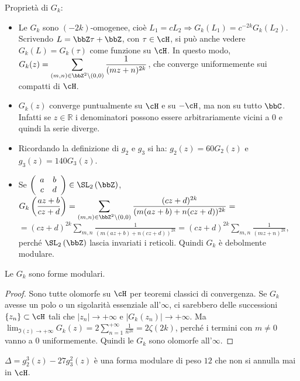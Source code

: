 \begin{osservazione}
Proprietà di $G_k$:

\begin{itemize}
\item Le $G_k$ sono $(-2k)$-omogenee, cioè
$L_1=cL_2 \Rightarrow G_k(L_1)=c^{-2k}G_k(L_2)$.
Scrivendo $L=\bbZ \tau + \bbZ$, con $\tau \in \cH$,
si può anche vedere $G_k(L) = G_k(\tau)$ come funzione su $\cH$.
In questo modo, $\displaystyle{G_k(z)=\sum_{(m,n) \in \bbZ^2 \setminus
(0,0)}{\frac{1}{(mz+n)^{2k}}}}$, che converge uniformemente sui compatti
di $\cH$.
\item $G_k(z)$ converge puntualmente su $\cH$ e su $-\cH$, ma non su tutto $\bbC$. Infatti se $z \in \mathbb{R}$ i denominatori possono
essere arbitrariamente vicini a $0$ e quindi la serie diverge.
\item Ricordando la definizione di $g_2$ e $g_3$ si ha: $g_2(z)=60G_2(z)$ e $g_3(z)=140G_3(z)$.
\item Se $\left( \begin{array}{cc} a & b \\ c & d \end{array} \right) \in
\SL_2 \left( \bbZ \right)$,
$\displaystyle{ G_k \left(\frac{az+b}{cz+d} \right) = 
\sum_{(m,n) \in \bbZ^2 \setminus (0,0)}
{\frac{(cz+d)^{2k}} {(m(az+b)+n(cz+d))^{2k}}} =}$
$\displaystyle{ =(cz+d)^{2k} \sum_{m,n}{\frac{1} {(m(az+b)+n(cz+d))^{2k}}} =
(cz+d)^{2k} \sum_{m,n}{\frac{1}{(mz+n)^{2k}}} }$, perché
$\SL_2 \left( \bbZ \right)$ lascia invariati i reticoli. Quindi $G_k$
è debolmente modulare.
\end{itemize}
\end{osservazione}


\begin{proposizione}
Le $G_k$ sono forme modulari.
\end{proposizione}

\begin{proof}
Sono tutte olomorfe su $\cH$ per teoremi classici di convergenza.
Se $G_k$ avesse un polo o un sigolarità essenziale all'$\infty$, ci sarebbero
delle successioni $\{ z_n \} \subset \cH$ tali che
$|z_n| \rightarrow +\infty$ e $|G_k(z_n)| \rightarrow +\infty$.
Ma $\displaystyle{\lim_{\Im(z) \rightarrow +\infty} G_k(z)=
2 \sum_{n=1}^{+\infty}{\frac{1}{n^{2k}}} = 2 \zeta(2k)}$, perché i termini
con $m \neq 0$ vanno a $0$ uniformemente. Quindi le $G_k$ sono olomorfe
all'$\infty$.
\end{proof}

\begin{osservazione}
$\Delta = g_2 ^3 (z) - 27 g_3 ^2 (z)$ è una forma modulare di peso $12$ che
non si annulla mai in $\cH$.
\end{osservazione}
